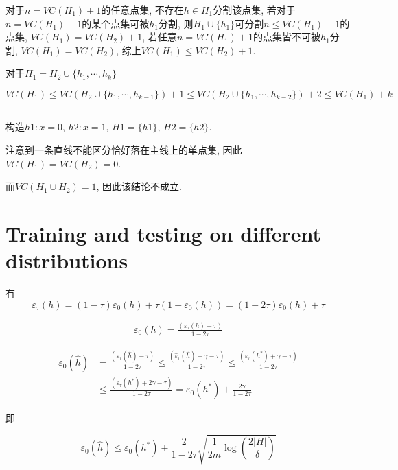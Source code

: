 \documentclass{ctexart}
\begin{document}
对于$n = VC(H_1) + 1$的任意点集, 不存在$h \in H_1$分割该点集, 若对于$n = VC(H_1) + 1$的某个点集可被$h_1$分割, 则$H_1 \cup \{h_1\}$可分割$n \le VC(H_1) + 1$的点集, $VC(H_1) = VC(H_2) + 1$, 若任意$n = VC(H_1) + 1$的点集皆不可被$h_1$分割, $VC(H_1) = VC(H_2)$, 综上$VC(H_1) \le VC(H_2) + 1$.

对于$H_1 = H_2 \cup \{h_1, \cdots, h_k\}$

\begin{equation}
	VC(H_1) \le VC(H_2 \cup \{h_1, \cdots, h_{k-1}\}) + 1 \le VC(H_2 \cup \{h_1, \cdots, h_{k-2}\}) + 2 \le VC(H_1) + k
\end{equation}

\subsection{}



构造$h1:x = 0$, $h2:x=1$, $H1 = \{h1\}$, $H2 = \{ h2\}$.

注意到一条直线不能区分恰好落在主线上的单点集, 因此$VC(H_1) = VC(H_2) = 0$. 

而$VC(H_1 \cup H_2) = 1$, 因此该结论不成立.

\section{Training and testing on different distributions}
有
\begin{equation}
	\varepsilon_{\tau}(h) = (1 - \tau) \varepsilon_0(h) + \tau (1 - \varepsilon_0(h)) = (1 - 2\tau) \varepsilon_0(h) + \tau
\end{equation}

\begin{align*}
	\varepsilon_0(h) = \frac{(\varepsilon_\tau(h) - \tau)}{1-2\tau}
\end{align*}

\begin{align*}
	\varepsilon_0(\hat{h}) &= \frac{(\varepsilon_\tau(\hat{h}) - \tau)}{1-2\tau} \le \frac{(\hat{\varepsilon}_\tau(\hat{h}) + \gamma - \tau)}{1-2\tau} \le \frac{(\hat{\varepsilon}_\tau(h^*) + \gamma - \tau)}{1-2\tau} \\
	& \le \frac{({\varepsilon}_\tau(h^*) + 2\gamma - \tau)}{1-2\tau} = \varepsilon_0(h^*) + \frac{2\gamma}{1-2\tau}
\end{align*}

即

\begin{equation}
	\varepsilon_0(\hat{h}) \le \varepsilon_0(h^*) + \frac{2}{1-2\tau}\sqrt{\frac{1}{2m}\log(\frac{2|H|}{\delta})}
\end{equation}
\end{document}
